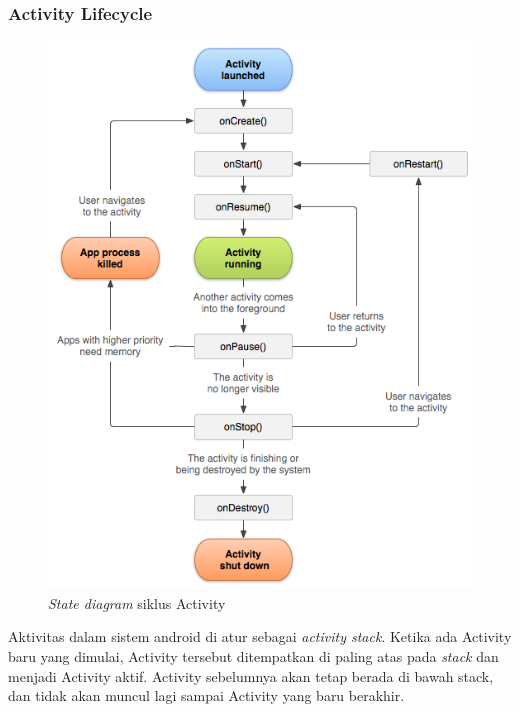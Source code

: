 \subsubsection{Activity Lifecycle}
\label{sssec:activity_lifecycle}
\begin{figure}[htbp]
	\centering
		\includegraphics[scale=0.48]{Gambar/activity-lifecycle.png}
	\caption{\textit{State diagram} siklus Activity}
	\label{fig:activity-lifecycle}
\end{figure}

Aktivitas dalam sistem android di atur sebagai \textit{activity stack}. Ketika ada Activity baru yang dimulai, Activity tersebut ditempatkan di paling atas pada \textit{stack} dan menjadi Activity aktif. Activity sebelumnya akan tetap berada di bawah stack, dan tidak akan muncul lagi sampai Activity yang baru berakhir. 

